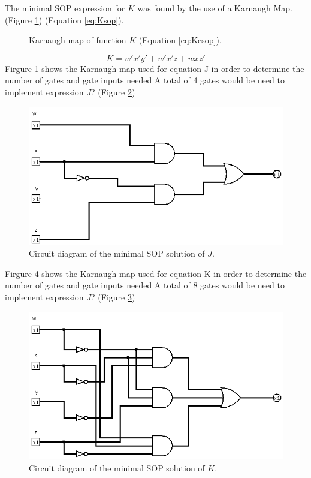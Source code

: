 \documentclass[12pt]{article}
\begin{document}
The minimal SOP expression for $K$ was found by the use of a Karnaugh Map.
(Figure \ref{fig:Kmap})
(Equation \ref{eq:Ksop}).
\begin{figure}[!hbt]
\begin{center}
\end{center}
\caption{Karnaugh map of function $K$ (Equation \ref{eq:Kcsop}).}
\label{fig:Kmap}
\end{figure}
\begin{equation}
K = w'x'y' + w'x'z + wxz' \label{eq:Ksop}
\end{equation}
Firgure 1 shows the Karnaugh map used for equation J in order to determine the number of gates and gate inputs needed
A total of 4 gates would be need to implement expression $J$?
(Figure \ref{fig:Jminsop-01})
\begin{figure}[htb]
\center
\includegraphics[scale=0.5]{Jminsop-01}
\caption{Circuit diagram of the minimal SOP solution of $J$.}
\label{fig:Jminsop-01}
\end{figure}
Firgure 4 shows the Karnaugh map used for equation K in order to determine the number of gates and gate inputs needed
A total of 8 gates would be need to implement expression $J$?
(Figure \ref{fig:Kminsop-01})
\begin{figure}[!htb]
\center
\includegraphics[scale=0.5]{Kminsop-01}
\caption{Circuit diagram of the minimal SOP solution of $K$.}
\label{fig:Kminsop-01}
\end{figure}
\end{document}

